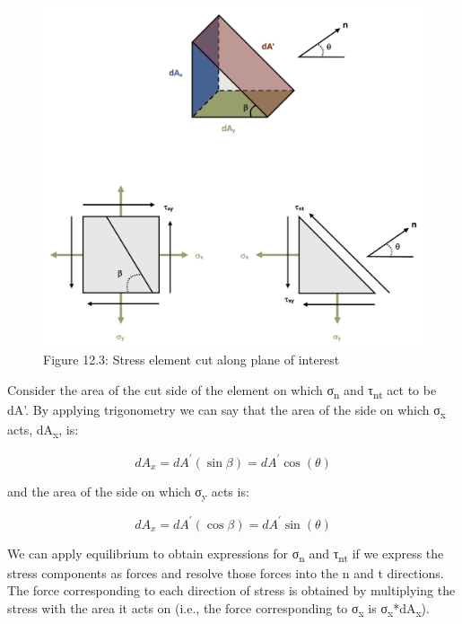\documentclass[
  letterpaper,
  DIV=11,
  numbers=noendperiod]{scrreprt}
\theoremstyle{definition}
\theoremstyle{remark}
\begin{document}
\begin{figure}[H]

{\centering \includegraphics[width=6.375in,height=\textheight]{images/CH12 figures/figure 12.3.png}

}

\caption{Figure 12.3: Stress element cut along plane of interest}

\end{figure}%

Consider the area of the cut side of the element on which
σ\textsubscript{n} and τ\textsubscript{nt} act to be dA'. By applying
trigonometry we can say that the area of the side on which
σ\textsubscript{x} acts, dA\textsubscript{x}, is:

\[
d A_x=d A^{\prime}(\sin \beta)=d A^{\prime} \cos (\theta)
\]

and the area of the side on which σ\textsubscript{y} acts is:

\[
d A_x=d A^{\prime}(\cos \beta)=d A^{\prime} \sin (\theta)
\]

We can apply equilibrium to obtain expressions for σ\textsubscript{n}
and τ\textsubscript{nt} if we express the stress components as forces
and resolve those forces into the n and t directions. The force
corresponding to each direction of stress is obtained by multiplying the
stress with the area it acts on (i.e., the force corresponding to
σ\textsubscript{x} is σ\textsubscript{x}*dA\textsubscript{x}).
\end{document}
